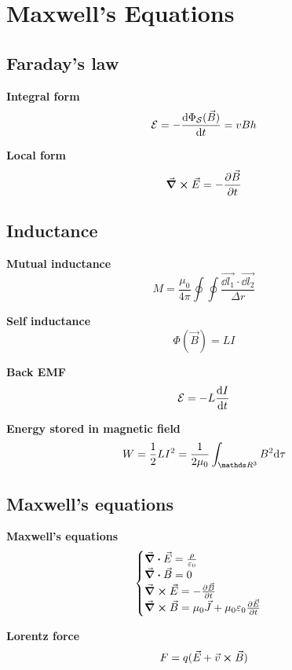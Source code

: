 \documentclass[10pt]{extarticle}
\numberwithin{equation}{section}
\begin{document}
\section{Maxwell's Equations}
\begin{multicols}{2}
    \subsection{Faraday's law}

    \textbf{Integral form}
    \begin{equation}
        \mathcal E = - \dv{\Phi_\mathcal{S}(\vec B)}{t} = v B h
    \end{equation}

    \textbf{Local form}
    \begin{equation}
        \curl \vec E = - \pdv{\vec B}{t}
    \end{equation}

    \subsection{Inductance}
    \textbf{Mutual inductance}
    \begin{equation}
        M = \frac{\mu_0}{4 \pi} \oint \oint \frac{\vec{\dd l_1} \cdot \vec{\dd l_2}}{\Delta r}
    \end{equation}

    \textbf{Self inductance}
    \begin{equation}
        \Phi(\vec B) = LI
    \end{equation}

    \textbf{Back EMF}
    \begin{equation}
        \mathcal E = - L \dv{I}{t}
    \end{equation}

    \textbf{Energy stored in magnetic field}
    \begin{equation}
        W = \half L I ^2 = \frac{1}{2 \mu_0} \int_{\R^3} B^2 \dd \tau
    \end{equation}

    \subsection{Maxwell's equations}

    \textbf{Maxwell's equations}
    \begin{equation}
        \begin{cases}
            \div \vec E = \frac{\rho}{\varepsilon_0}                          \\
            \div \vec B = 0                                                   \\
            \curl \vec E = -\pdv{\vec B}{t}                                   \\
            \curl \vec B = \mu_0 \vec J + \mu_0 \varepsilon_0 \pdv{\vec E}{t} \\
        \end{cases}
    \end{equation}

    \textbf{Lorentz force}
    \begin{equation}
        F = q(\vec E + \vec v \cross \vec B)
    \end{equation}
\end{multicols}
\end{document}
